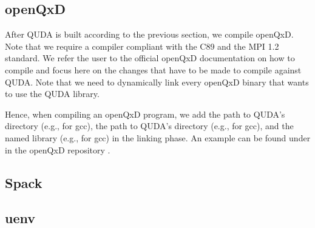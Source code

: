 \subsection{openQxD}

After QUDA is built according to the previous section, we compile openQxD. Note that we require a compiler compliant with the C89 and the MPI 1.2 standard. We refer the user to the official openQxD documentation \cite{openqxd} on how to compile and focus here on the changes that have to be made to compile against QUDA. Note that we need to dynamically link every openQxD binary that wants to use the QUDA library.


Hence, when compiling an openQxD program, we add the path to QUDA's  directory (e.g.,  for gcc), the path to QUDA's  directory (e.g.,  for gcc), and the named library (e.g.,  for gcc) in the linking phase. An example  can be found under  in the openQxD repository \cite{openqxd}.



\subsection{Spack}


\subsection{uenv}

